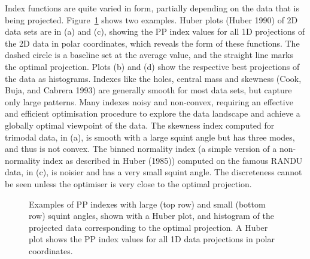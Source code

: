 \documentclass[
  12pt,
]{interact}
\theoremstyle{plain}
\begin{document}
Index functions are quite varied in form, partially depending on the
data that is being projected. Figure~\ref{fig-example-functions} shows
two examples. Huber plots (Huber 1990) of 2D data sets are in (a) and
(c), showing the PP index values for all 1D projections of the 2D data
in polar coordinates, which reveals the form of these functions. The
dashed circle is a baseline set at the average value, and the straight
line marks the optimal projection. Plots (b) and (d) show the respective
best projections of the data as histograms. Indexes like the holes,
central mass and skewness (Cook, Buja, and Cabrera 1993) are generally
smooth for most data sets, but capture only large patterns. Many indexes
noisy and non-convex, requiring an effective and efficient optimisation
procedure to explore the data landscape and achieve a globally optimal
viewpoint of the data. The skewness index computed for trimodal data, in
(a), is smooth with a large squint angle but has three modes, and thus
is not convex. The binned normality index (a simple version of a
non-normality index as described in Huber (1985)) computed on the famous
RANDU data, in (c), is noisier and has a very small squint angle. The
discreteness cannot be seen unless the optimiser is very close to the
optimal projection.

\begin{figure}


\caption{\label{fig-example-functions}Examples of PP indexes with large
(top row) and small (bottom row) squint angles, shown with a Huber plot,
and histogram of the projected data corresponding to the optimal
projection. A Huber plot shows the PP index values for all 1D data
projections in polar coordinates.}

\end{figure}%
\end{document}
